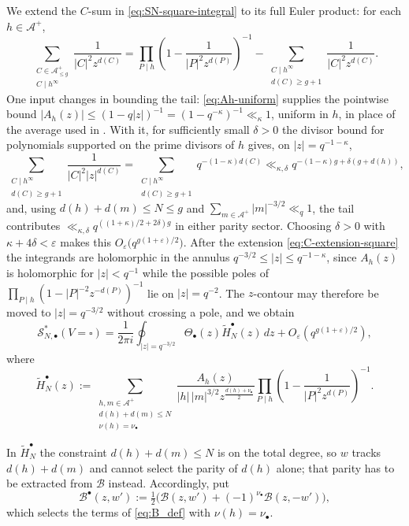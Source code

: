 \documentclass[a4paper,reqno]{amsart}
\numberwithin{equation}{section}
\theoremstyle{remark}
\theoremstyle{definition}
\newcommand{\A}{\mathcal{A}}
\begin{document}
We extend the $C$-sum in \eqref{eq:SN-square-integral} to its full Euler
product: for each
$h\in\A^+$,
\begin{equation}\label{eq:C-extension-square}
\sum_{\substack{C\in\A^+_{\le g}\\ C\mid h^\infty}}
\frac{1}{|C|^2z^{d(C)}}
=
\prod_{P\mid h}
\left(
1-\frac{1}{|P|^2z^{d(P)}}
\right)^{-1}
-
\sum_{\substack{C\mid h^\infty\\ d(C)\ge g+1}}
\frac{1}{|C|^2z^{d(C)}}.
\end{equation}
One input changes in bounding the tail: \eqref{eq:Ah-uniform} supplies the
pointwise bound $|A_h(z)|\le(1-q|z|)^{-1}=(1-q^{-\kappa})^{-1}\ll_\kappa1$,
uniform in $h$, in place of the average used in \cite[Section~6]{Fl17-1}.
With it, for sufficiently small $\delta>0$ the divisor bound for
polynomials supported on the prime divisors of $h$ gives, on
$|z|=q^{-1-\kappa}$,
$$
\sum_{\substack{C\mid h^\infty\\d(C)\ge g+1}}\frac{1}{|C|^2|z|^{d(C)}}
=\sum_{\substack{C\mid h^\infty\\d(C)\ge g+1}}q^{-(1-\kappa)d(C)}
\ll_{\kappa,\delta}q^{-(1-\kappa)g+\delta(g+d(h))},
$$
and, using $d(h)+d(m)\le N\le g$ and $\sum_{m\in\A^+}|m|^{-3/2}\ll_q1$, the
tail contributes $\ll_{\kappa,\delta}q^{((1+\kappa)/2+2\delta)g}$ in
either parity sector. Choosing $\delta>0$ with
$\kappa+4\delta<\varepsilon$ makes
this $O_\varepsilon\bigl(q^{g(1+\varepsilon)/2}\bigr)$.
After the extension \eqref{eq:C-extension-square} the integrands are
holomorphic in the annulus
$q^{-3/2}\le|z|\le q^{-1-\kappa}$, since $A_h(z)$ is holomorphic for
$|z|<q^{-1}$ while the possible poles of
$\prod_{P\mid h}(1-|P|^{-2}z^{-d(P)})^{-1}$ lie on $|z|=q^{-2}$. The
$z$-contour may therefore be moved to $|z|=q^{-3/2}$ without crossing a
pole, and we obtain
\begin{equation}\label{eq:SN-square-fullC}
\mathcal S_{N,\bullet}^{*}(V=\square)
=
\frac{1}{2\pi i}
\oint_{|z|=q^{-3/2}}
\Theta_\bullet(z)\widetilde H_N^{\bullet}(z)\,dz
+
O_\varepsilon\!\left(q^{g(1+\varepsilon)/2}\right),
\end{equation}
where
$$
\widetilde H_N^{\bullet}(z)
:=
\sum_{\substack{h,m\in\A^+\\
d(h)+d(m)\le N\\
\nu(h)=\nu_\bullet}}
\frac{A_h(z)}{|h|\,|m|^{3/2}z^{\frac{d(h)+\nu_\bullet}{2}}}
\prod_{P\mid h}
\left(
1-\frac{1}{|P|^2z^{d(P)}}
\right)^{-1}.
$$

In $\widetilde H_N^{\bullet}$ the constraint $d(h)+d(m)\le N$ is on the
total degree, so $w$ tracks $d(h)+d(m)$ and cannot
select the parity of $d(h)$ alone; that parity has to be extracted from
$\mathcal B$ instead. Accordingly, put
$$
\mathcal B^{\bullet}(z,w')
:=
\tfrac12\bigl(\mathcal B(z,w')+(-1)^{\nu_\bullet}\mathcal B(z,-w')\bigr),
$$
which selects the terms of \eqref{eq:B_def} with $\nu(h)=\nu_\bullet$.
\end{document}
